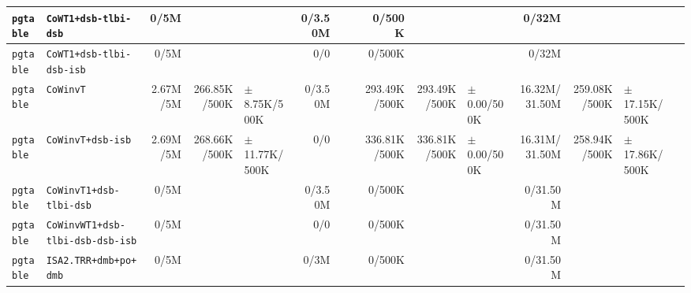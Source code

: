 \begin{tabular}{l l  | r r l | r r l | r r l | r r l l}
     \verb|pgtable| &                                  \verb|CoWT1+dsb-tlbi-dsb| &           0/5M &                       &                   &        0/3.50M &                       &                 &         0/500K &                       &                   &          0/32M &                       &                   & \\ \hline 
     \verb|pgtable| &                              \verb|CoWT1+dsb-tlbi-dsb-isb| &           0/5M &                       &                   &            0/0 &                       &                 &         0/500K &                       &                   &          0/32M &                       &                   & \\ \hline 
     \verb|pgtable| &                                             \verb|CoWinvT| &       2.67M/5M &          266.85K/500K &  $\pm$ 8.75K/500K &        0/3.50M &                       &                 &   293.49K/500K &          293.49K/500K &   $\pm$ 0.00/500K &  16.32M/31.50M &          259.08K/500K & $\pm$ 17.15K/500K & \\ \hline 
     \verb|pgtable| &                                     \verb|CoWinvT+dsb-isb| &       2.69M/5M &          268.66K/500K & $\pm$ 11.77K/500K &            0/0 &                       &                 &   336.81K/500K &          336.81K/500K &   $\pm$ 0.00/500K &  16.31M/31.50M &          258.94K/500K & $\pm$ 17.86K/500K & \\ \hline 
     \verb|pgtable| &                               \verb|CoWinvT1+dsb-tlbi-dsb| &           0/5M &                       &                   &        0/3.50M &                       &                 &         0/500K &                       &                   &       0/31.50M &                       &                   & \\ \hline 
     \verb|pgtable| &                      \verb|CoWinvWT1+dsb-tlbi-dsb-dsb-isb| &           0/5M &                       &                   &            0/0 &                       &                 &         0/500K &                       &                   &       0/31.50M &                       &                   & \\ \hline 
     \verb|pgtable| &                                 \verb|ISA2.TRR+dmb+po+dmb| &           0/5M &                       &                   &           0/3M &                       &                 &         0/500K &                       &                   &       0/31.50M &                       &                   & \\ \hline 

\end{tabular}
